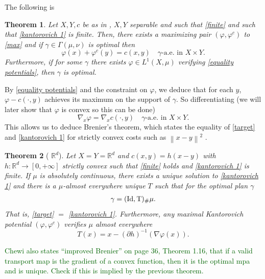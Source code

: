 \documentclass[
    a4paper,
    DIV=14,
    abstract=true,
    numbers=noenddot
]
{scrartcl}
\newtheorem{theorem}{Theorem}[section]
\theoremstyle{definition}
\newcommand{\liam}{\textcolor{darkgreen}}
\renewcommand{\norm}[1]{\left\lVert #1 \right\rVert}\renewcommand{\abs}[1]{\left| #1 \right|}
\newcommand{\R}{\mathbb{R}}
\begin{document}
The following is \cite[Theorem 6.1.5]{ambrosio2005gradient}
\begin{theorem}
Let $X, Y,c$ be as in , $X, Y$ separable and such that \eqref{finite} and such that \eqref{kantorovich 1} is finite. Then, there exists a maximizing pair $(\varphi, \varphi^c)$ to \eqref{max} and if $\gamma \in \Gamma(\mu, \nu)$ is optimal then
\begin{equation}\label{equality potentials}
\varphi(x) + \varphi^c(y) = c(x,y) \quad \gamma\text{-a.e. in } X \times Y.
\end{equation}
Furthermore, if for some $\gamma $  there exists  $\varphi \in L^1(X,\mu)$ verifying \eqref{equality potentials}, then $\gamma$ is optimal.
\end{theorem}
By \eqref{equality potentials} and the constraint on $\varphi$, we deduce that for each $y$, $\varphi-c(\cdot,y)$ achieves its maximum on the support of $\gamma$. So differentiating (we will later show that $\varphi$ is convex so this can be done) 
\begin{equation*}
    \nabla_x \varphi =\nabla_xc(\cdot,y) \quad \gamma\text{-a.e. in } X \times Y.
\end{equation*}
This allows us to deduce Brenier's theorem, which states the equality of \eqref{target} and \eqref{kantorovich 1} for strictly convex costs such as $\norm{x-y}^2$  \cite[Proposition 3.1]{brenier1987decomposition}.
\begin{theorem}[ $\mathbb{R}^d$] \label{Map theorem}
Let $X=Y=\R^d$ and $c(x,y) = h(x-y)$ with $h : \mathbb{R}^d \to [0,+\infty]$ strictly convex such that \eqref{finite} holds and \eqref{kantorovich 1} is finite. If $\mu$ is absolutely continuous, there exists a unique solution to \eqref{kantorovich 1} and there is a $\mu $-almost everywhere  unique $T$ such that for the optimal plan $\gamma $
\begin{align*}
    \gamma =(\rm{Id},T)_{\#} \mu.
\end{align*}
That is, \eqref{target} $=$ \eqref{kantorovich 1}. Furthermore, any maximal Kantorovich potential $(\varphi,\varphi^c)$ verifies $\mu $ almost everywhere    
\begin{equation}
T(x) = x - (\partial h)^{-1}\left(\nabla\varphi(x)\right).
\end{equation}
\end{theorem}
\liam{Chewi also states ``improved Brenier'' on page 36, Theorem 1.16, that if a valid transport map is the gradient of a convex function, then it is the optimal mpa and is unique. Check if this is implied by the previous theorem.}
\end{document}
